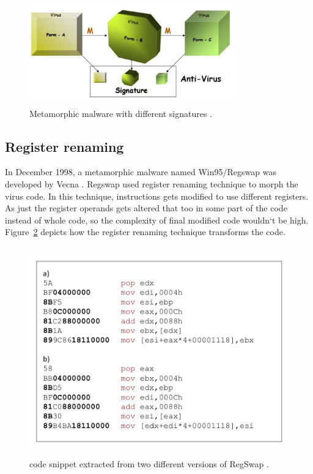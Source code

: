 \begin{figure}
  \centering
      \includegraphics[width=9cm, height=4.5cm]{aimalwarepic.png}
    \caption[Metamorphic malware with different signatures]{Metamorphic malware with different signatures \cite{bib20}.}
    \label{fig:aimalware}
\end{figure}

\subsection{Register renaming} 

In December 1998, a metamorphic malware named Win95/Regswap was developed by Vecna \cite{bib22}. Regswap used register renaming technique to morph the virus code. In this technique, instructions gets modified to use different registers. As just the register operands gets altered that too in some part of the code instead of whole code, so the complexity of final modified code wouldn`t be high. Figure~\ref{fig:regswap} depicts how the register renaming technique transforms the code.

\begin{figure}
  \centering
      \includegraphics[width=12.9cm, height=9cm]{regswap.jpg}
    \caption[Register Renaming Example]{code snippet extracted from two different versions of RegSwap \cite{bib22}.}
    \label{fig:regswap}
\end{figure}


